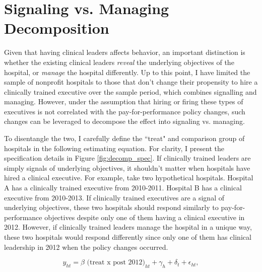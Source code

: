 \documentclass[12pt]{article}
\begin{document}
\begin{figure}[ht!]
\begin{subfigure}[b]{0.45\textwidth}
         \label{fig:mort_synth_plotc}
     \end{subfigure}
        \label{fig:mort_synth_plot}
    \end{figure}
    

\section{Signaling vs. Managing Decomposition}\label{sec:sig_man}

    Given that having clinical leaders affects behavior, an important distinction is whether the existing clinical leaders \textit{reveal} the underlying objectives of the hospital, or \textit{manage} the hospital differently. Up to this point, I have limited the sample of nonprofit hospitals to those that don't change their propensity to hire a clinically trained executive over the sample period, which combines signalling and managing. However, under the assumption that hiring or firing these types of executives is not correlated with the pay-for-performance policy changes, such changes can be leveraged to decompose the effect into signaling vs. managing.

    To disentangle the two, I carefully define the ``treat" and comparison group of hospitals in the following estimating equation. For clarity, I present the specification details in Figure \ref{fig:decomp_spec}. If clinically trained leaders are simply signals of underlying objectives, it shouldn't matter when hospitals have hired a clinical executive. For example, take two hypothetical hospitals. Hospital A has a clinically trained executive from 2010-2011. Hospital B has a clinical executive from 2010-2013. If clinically trained executives are a signal of underlying objectives, these two hospitals should respond similarly to pay-for-performance objectives despite only one of them having a clinical executive in 2012. However, if clinically trained leaders manage the hospital in a unique way, these two hospitals would respond differently since only one of them has clinical leadership in 2012 when the policy changes occurred. 

    \begin{equation}
    \label{eq:decomp}
    y_{ht} = \beta \text{ (treat x post 2012)}_{ht} + \gamma_{h} + \delta_t + \epsilon_{ht},
    \end{equation}
    
\end{document}

